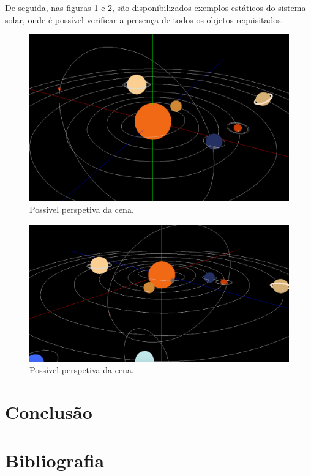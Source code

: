 \documentclass[a4paper]{article}
\begin{document}
De seguida, nas figuras \ref{img:scene_1} e \ref{img:scene_2}, são disponibilizados exemplos estáticos do sistema solar, onde é possível verificar a presença de todos os objetos requisitados.

\begin{figure}[H]
\centering
\includegraphics[scale=0.32]{scene_1.png}
\caption{Possível perspetiva da cena.}
\label{img:scene_1}
\end{figure}

\begin{figure}[H]
\centering
\includegraphics[scale=0.3]{scene_2.png}
\caption{Possível perspetiva da cena.}
\label{img:scene_2}
\end{figure}


\section{Conclusão}
\label{sec:conclusao}


\section{Bibliografia}
\label{sec:bibliografia}
\end{document}
